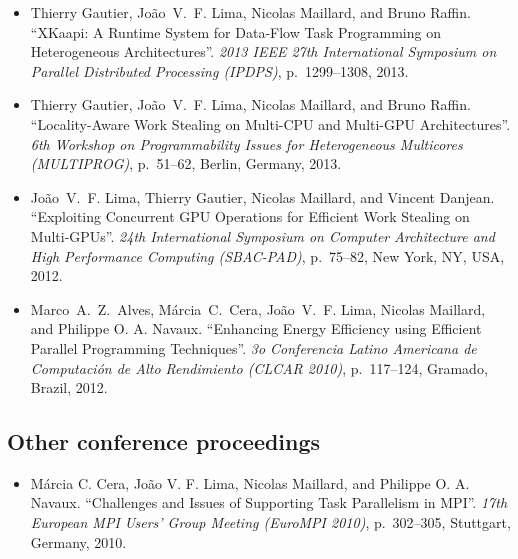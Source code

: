 \documentclass[11pt,a4paper]{article}
\begin{document}
\begin{itemize}
\item 
Thierry Gautier, João~V.~F. Lima, Nicolas Maillard, and Bruno Raffin.
``XKaapi: A Runtime System for Data-Flow Task Programming on Heterogeneous Architectures''.
\emph{2013 IEEE 27th International Symposium on Parallel Distributed Processing (IPDPS)}, p.~1299--1308, 2013.

\item
Thierry Gautier, João~V.~F. Lima, Nicolas Maillard, and Bruno Raffin.
``Locality-Aware Work Stealing on Multi-CPU and Multi-GPU Architectures''.
\emph{6th Workshop on Programmability Issues for Heterogeneous Multicores (MULTIPROG)}, 
p.~51--62, Berlin, Germany, 2013.

\item 
João~V.~F. Lima, Thierry Gautier, Nicolas Maillard, and Vincent Danjean.
``Exploiting Concurrent GPU Operations for Efficient Work Stealing on Multi-GPUs''.
\emph{24th International Symposium on Computer Architecture and High Performance Computing (SBAC-PAD)}, p.~75--82, New York, NY, USA, 2012.

\item
Marco~A.~Z.~Alves, Márcia~C.~Cera, João~V.~F. Lima, Nicolas Maillard, and Philippe O. A. Navaux.
``Enhancing Energy Efficiency using Efficient Parallel Programming Techniques''.
\emph{3o Conferencia Latino Americana de Computación de Alto Rendimiento (CLCAR 2010)},
p.~117--124, Gramado, Brazil, 2012.

\end{itemize}


\subsection{Other conference proceedings}

\begin{itemize} \itemsep -2pt

\item Márcia C. Cera, João V. F. Lima, Nicolas Maillard, and Philippe O. A. Navaux.
``Challenges and Issues of Supporting Task Parallelism in MPI''.
\emph{17th European MPI Users' Group Meeting (EuroMPI 2010)},
p.~302--305, Stuttgart, Germany, 2010.

\end{itemize}


\end{document}
